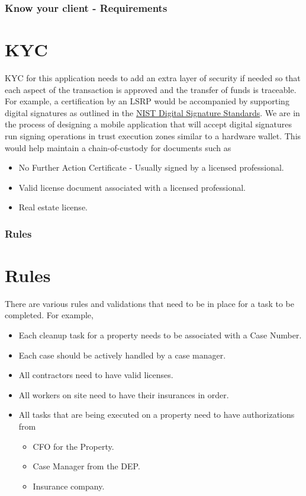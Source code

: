 \documentclass{beamer}
\begin{document}
\begin{frame}
\frametitle{Know your client - Requirements}
\section {KYC}
KYC for this application needs to add an extra layer of security if needed so that each aspect of the transaction is approved and the transfer of funds is traceable. For example, a certification by an LSRP would be accompanied by supporting digital signatures as outlined in the \href{https://pages.nist.gov/800-63-3/}{NIST Digital Signature Standards}. We are in the process of designing a mobile application that will accept digital signatures run signing operations in trust execution zones similar to a hardware wallet. This would help maintain a chain-of-custody for documents such as
  \begin{itemize}
    \item No Further Action Certificate - Usually signed by a licensed professional.
    \item Valid license document associated with a licensed professional.
    \item Real estate license.
  \end{itemize}

\end{frame}

\begin{frame}

\frametitle{Rules}
\section{Rules}
  There are various rules and validations that need to be in place for a task to be completed. For example, 
    \begin{itemize}
        \item Each cleanup task for a property needs to be associated with a Case Number. 
        \item Each case should be actively handled by a case manager.
        \item All contractors need to have valid licenses.
        \item All workers on site need to have their insurances in order.
        \item All tasks that are being executed on a property need to have authorizations from
          \begin{itemize}
            \item CFO for the Property.
            \item Case Manager from the DEP.
            \item Insurance company. 
          \end{itemize}
    \end{itemize}
\end{frame}
\end{document}
